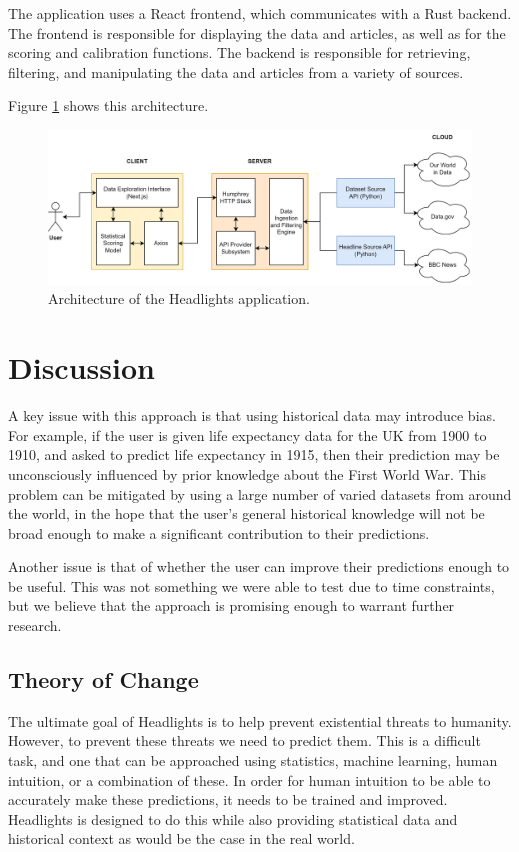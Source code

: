 \documentclass{article}
\begin{document}
The application uses a React frontend, which communicates with a Rust backend. The frontend is responsible for displaying the data and articles, as well as for the scoring and calibration functions. The backend is responsible for retrieving, filtering, and manipulating the data and articles from a variety of sources.

Figure \ref{fig:architecture} shows this architecture.

\begin{figure}[h]
  \centering
  \includegraphics[width=\textwidth]{architecture.png}
  \caption{Architecture of the Headlights application.}
  \label{fig:architecture}
\end{figure}

\section{Discussion}

A key issue with this approach is that using historical data may introduce bias. For example, if the user is given life expectancy data for the UK from 1900 to 1910, and asked to predict life expectancy in 1915, then their prediction may be unconsciously influenced by prior knowledge about the First World War. This problem can be mitigated by using a large number of varied datasets from around the world, in the hope that the user's general historical knowledge will not be broad enough to make a significant contribution to their predictions.

Another issue is that of whether the user can improve their predictions enough to be useful. This was not something we were able to test due to time constraints, but we believe that the approach is promising enough to warrant further research.

\subsection{Theory of Change}

The ultimate goal of Headlights is to help prevent existential threats to humanity. However, to prevent these threats we need to predict them. This is a difficult task, and one that can be approached using statistics, machine learning, human intuition, or a combination of these. In order for human intuition to be able to accurately make these predictions, it needs to be trained and improved. Headlights is designed to do this while also providing statistical data and historical context as would be the case in the real world.
\end{document}
